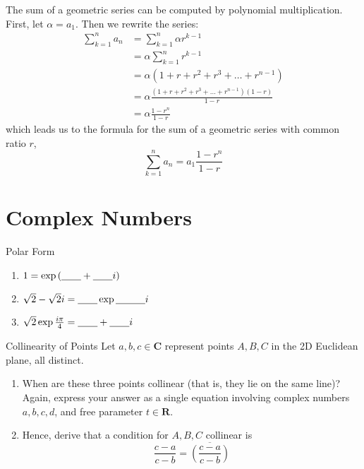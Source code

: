 \documentclass[a4paper,10pt]{report}
\newcommand{\im}{i}
\begin{document}
The sum of a geometric series can be computed by polynomial multiplication.
First, let $\alpha = a_1$. Then we rewrite the series: \begin{align*}
 \sum_{k=1}^n a_n
 &= \sum_{k=1}^n \alpha r^{k-1} \\
 &= \alpha \sum_{k=1}^n r^{k-1} \\
 &= \alpha (1 + r + r^2 + r^3 + \dots + r^{n-1}) \\
 &= \alpha \frac{(1 + r + r^2 + r^3 + \dots + r^{n-1})(1-r)}{1-r} \\
 &= \alpha \frac{1-r^n}{1-r}
\end{align*} which leads us to the formula for the sum of a geometric series
with common ratio $r$,
\begin{equation}
 \sum_{k=1}^n a_n = a_1 \frac{1 - r^n}{1 - r}
\end{equation}

\chapter{Complex Numbers}

\begin{problem}{Polar Form}
  \begin{enumerate}[\hspace{.5cm}a.]
    \item \(1 = \exp\left(\blankB + \blankB\im\right)\)
    \item \(\sqrt{2}-\sqrt{2}\im = \blankB\exp\blankC\im\)
    \item \(\sqrt{2}\exp\frac{\im\pi}{4} = \blankB + \blankB\im\)
  \end{enumerate}
\end{problem}

\begin{problem}{Collinearity of Points}
  Let \(a, b, c\in\mathbf{C}\) represent points \(A, B, C\) in the 2D Euclidean
  plane, all distinct.

  \begin{enumerate}[\hspace{.5cm}a.]
    \item When are these three points collinear (that is, they lie on the same
    line)? Again, express your answer as a single equation involving complex
    numbers \(a, b, c, d\), and free parameter \(t\in\mathbf{R}\).
    \item Hence, derive that a condition for \(A, B, C\) collinear is \[
      \frac{c-a}{c-b} = \overline{\left(\frac{c-a}{c-b}\right)}
    \]
  \end{enumerate}
\end{problem}
\end{document}

